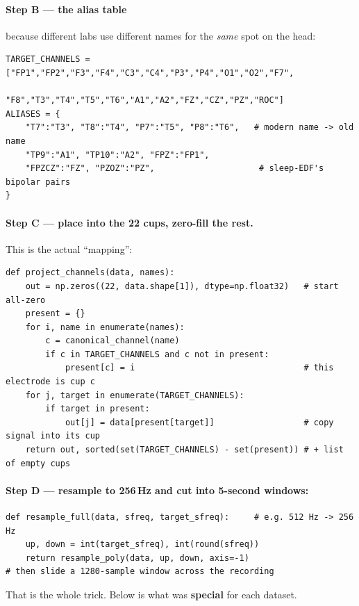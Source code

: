\documentclass[11pt]{article}
\begin{document}
\paragraph{Step B --- the alias table} because different labs use different
names for the \emph{same} spot on the head:
\begin{lstlisting}
TARGET_CHANNELS = ["FP1","FP2","F3","F4","C3","C4","P3","P4","O1","O2","F7",
                   "F8","T3","T4","T5","T6","A1","A2","FZ","CZ","PZ","ROC"]
ALIASES = {
    "T7":"T3", "T8":"T4", "P7":"T5", "P8":"T6",   # modern name -> old name
    "TP9":"A1", "TP10":"A2", "FPZ":"FP1",
    "FPZCZ":"FZ", "PZOZ":"PZ",                     # sleep-EDF's bipolar pairs
}
\end{lstlisting}

\paragraph{Step C --- place into the 22 cups, zero-fill the rest.} This is the
actual ``mapping'':
\begin{lstlisting}
def project_channels(data, names):
    out = np.zeros((22, data.shape[1]), dtype=np.float32)   # start all-zero
    present = {}
    for i, name in enumerate(names):
        c = canonical_channel(name)
        if c in TARGET_CHANNELS and c not in present:
            present[c] = i                                  # this electrode is cup c
    for j, target in enumerate(TARGET_CHANNELS):
        if target in present:
            out[j] = data[present[target]]                  # copy signal into its cup
    return out, sorted(set(TARGET_CHANNELS) - set(present)) # + list of empty cups
\end{lstlisting}

\paragraph{Step D --- resample to 256\,Hz and cut into 5-second windows:}
\begin{lstlisting}
def resample_full(data, sfreq, target_sfreq):     # e.g. 512 Hz -> 256 Hz
    up, down = int(target_sfreq), int(round(sfreq))
    return resample_poly(data, up, down, axis=-1)
# then slide a 1280-sample window across the recording
\end{lstlisting}

That is the whole trick. Below is what was \textbf{special} for each dataset.

\end{document}

